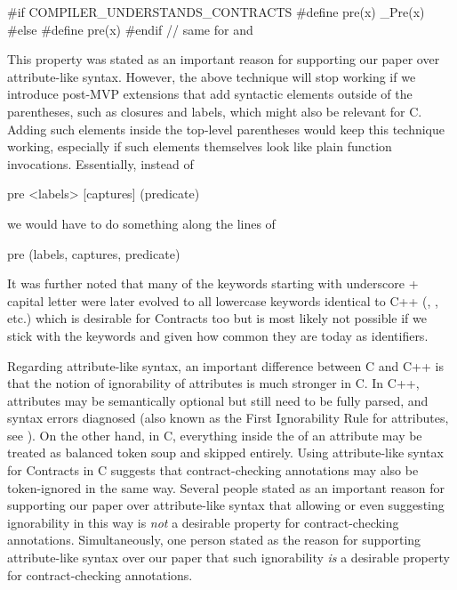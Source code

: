 \begin{codeblock}
#if COMPILER_UNDERSTANDS_CONTRACTS
  #define pre(x) _Pre(x)
#else
  #define pre(x)
#endif
// same for  and 
\end{codeblock}

This property was stated as an important reason for supporting our paper over attribute-like syntax. However, the above technique will stop working if we introduce post-MVP extensions that add syntactic elements outside of the parentheses, such as closures and labels,
which might also be relevant for C. Adding such elements inside the top-level parentheses would keep this technique working, especially if such elements themselves look like plain function invocations. Essentially, instead of

\begin{codeblock}
pre <labels> [captures] (predicate)
\end{codeblock}

we would have to do something along the lines of

\begin{codeblock}
pre (labels, captures, predicate)
\end{codeblock}

It was further noted that many of the keywords starting with underscore + capital letter were later evolved to all lowercase keywords identical to C++ (, , etc.) which is desirable for Contracts too but is most likely not possible if we stick with the keywords  and  given how common they are today as identifiers.

Regarding attribute-like syntax, an important difference between C and C++ is that the notion of ignorability of attributes is much stronger in C. In C++, attributes may be semantically optional but still need to be fully parsed, and syntax errors diagnosed (also known as the First Ignorability Rule for attributes, see \cite{P2552R3}). On the other hand, in C, everything inside the \tcode{[[...]]} of an attribute may be treated as balanced token soup and skipped entirely. Using attribute-like syntax for Contracts in C suggests that contract-checking annotations may also be token-ignored in the same way. Several people stated as an important reason for supporting our paper over attribute-like syntax that allowing or even suggesting ignorability in this way is \emph{not} a desirable property for contract-checking annotations. Simultaneously, one person stated as the reason for supporting attribute-like syntax over our paper that such ignorability \emph{is} a desirable property for contract-checking annotations.

